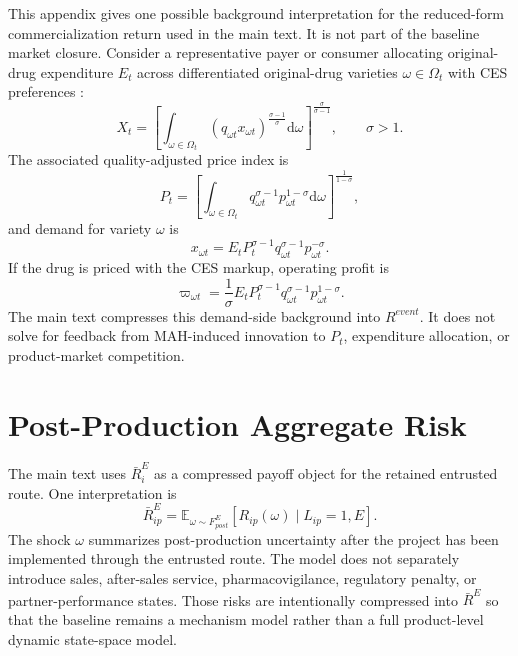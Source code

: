 \documentclass[12pt]{article}
\newcommand{\E}{\mathbb{E}}
\newcommand{\1}{\mathbf{1}}
\newcommand{\dd}{\mathrm{d}}
\begin{document}
This appendix gives one possible background interpretation for the reduced-form commercialization return used in the main text. It is not part of the baseline market closure. Consider a representative payer or consumer allocating original-drug expenditure $E_t$ across differentiated original-drug varieties $\omega\in\Omega_t$ with CES preferences \citep{DixitStiglitz1977,Melitz2003}:
\begin{equation}
    X_t
    =
    \left[
    \int_{\omega\in\Omega_t}
    \left(q_{\omega t}x_{\omega t}\right)^{\frac{\sigma-1}{\sigma}}
    \dd\omega
    \right]^{\frac{\sigma}{\sigma-1}},
    \qquad \sigma>1.
    \label{eq:ces_utility}
\end{equation}
The associated quality-adjusted price index is
\begin{equation}
    P_t
    =
    \left[
    \int_{\omega\in\Omega_t}
    q_{\omega t}^{\sigma-1}p_{\omega t}^{1-\sigma}
    \dd\omega
    \right]^{\frac{1}{1-\sigma}},
    \label{eq:ces_price_index}
\end{equation}
and demand for variety $\omega$ is
\begin{equation}
    x_{\omega t}
    =
    E_tP_t^{\sigma-1}q_{\omega t}^{\sigma-1}p_{\omega t}^{-\sigma}.
    \label{eq:ces_demand}
\end{equation}
If the drug is priced with the CES markup, operating profit is
\begin{equation}
    \varpi_{\omega t}
    =
    \frac{1}{\sigma}
    E_tP_t^{\sigma-1}q_{\omega t}^{\sigma-1}p_{\omega t}^{1-\sigma}.
    \label{eq:ces_profit}
\end{equation}
The main text compresses this demand-side background into $R^{event}$. It does not solve for feedback from MAH-induced innovation to $P_t$, expenditure allocation, or product-market competition.

\section{Post-Production Aggregate Risk}
\label{sec:post_risk_appendix}

The main text uses $\bar R_i^E$ as a compressed payoff object for the retained entrusted route. One interpretation is
\begin{equation}
    \bar R^E_{ip}
    =
    \E_{\omega\sim F_{post}^E}
    [R_{ip}(\omega)\mid L_{ip}=1,E].
    \label{eq:post_risk_Rbar}
\end{equation}
The shock $\omega$ summarizes post-production uncertainty after the project has been implemented through the entrusted route. The model does not separately introduce sales, after-sales service, pharmacovigilance, regulatory penalty, or partner-performance states. Those risks are intentionally compressed into $\bar R^E$ so that the baseline remains a mechanism model rather than a full product-level dynamic state-space model.
\end{document}
